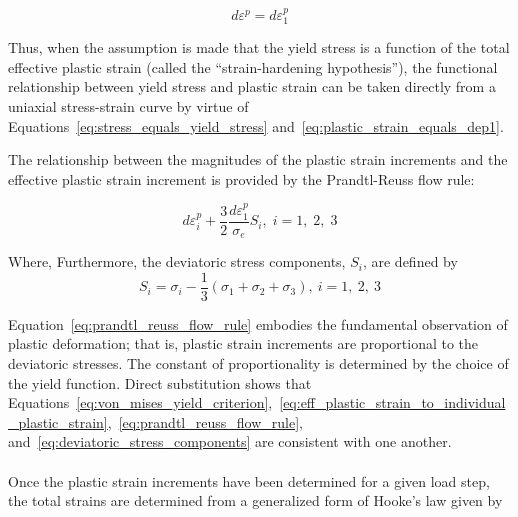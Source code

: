 \begin{equation}
    \label{eq:plastic_strain_equals_dep1}
    d\varepsilon^{p} = d\varepsilon_{1}^{p} 
\end{equation}

Thus, when the assumption is made that the yield stress is a function of the total effective plastic
strain (called the ``strain-hardening hypothesis''), the functional relationship between yield
stress and plastic strain can be taken directly from a uniaxial stress-strain curve by virtue of
Equations~\ref{eq:stress_equals_yield_stress} and~\ref{eq:plastic_strain_equals_dep1}.

The relationship between the magnitudes of the plastic strain increments and the effective plastic
strain increment is provided by the Prandtl-Reuss flow rule:

\begin{equation}
    \label{eq:prandtl_reuss_flow_rule}
    d\varepsilon_{i}^{p} + \frac{3}{2}\frac{d\varepsilon_{1}^{p}}{\sigma_{e}}S_{i},\; i = 1,\; 2,\; 3
\end{equation}

Where,
Furthermore, the deviatoric stress components, $S_{i}$, are defined by
\begin{equation}
    S_{i} = \sigma_{i} - \frac{1}{3}\left( \sigma_{1} + \sigma_{2} + \sigma_{3} \right),\ i = 1,\ 2,\ 3
    \label{eq:deviatoric_stress_components}
\end{equation}

Equation~\ref{eq:prandtl_reuss_flow_rule} embodies the fundamental observation of plastic
deformation; that is, plastic strain increments are proportional to the deviatoric stresses. The
constant of proportionality is determined by the choice of the yield function. Direct substitution
shows that
Equations~\ref{eq:von_mises_yield_criterion},~\ref{eq:eff_plastic_strain_to_individual_plastic_strain},~\ref{eq:prandtl_reuss_flow_rule},
and~\ref{eq:deviatoric_stress_components} are consistent with one another.
\\
\\
Once the plastic strain increments have been determined for a given load step, the total strains are
determined from a generalized form of Hooke's law given by

